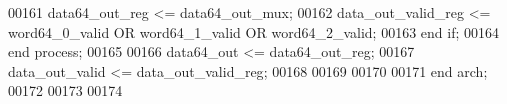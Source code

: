 \begin{DoxyCode}
00161          \textcolor{vhdlchar}{data64_out_reg}     \textcolor{vhdlchar}{<=} \textcolor{vhdlchar}{data64_out_mux}; 
00162             \textcolor{vhdlchar}{data_out_valid_reg} \textcolor{vhdlchar}{<=} \textcolor{vhdlchar}{word64_0_valid} \textcolor{keywordflow}{OR} \textcolor{vhdlchar}{word64_1_valid} \textcolor{keywordflow}{OR} \textcolor{vhdlchar}{
      word64_2_valid};
00163         \textcolor{keywordflow}{end} \textcolor{keywordflow}{if};
00164     \textcolor{keywordflow}{end} \textcolor{keywordflow}{process};
00165     
00166 \textcolor{vhdlchar}{data64_out}     \textcolor{vhdlchar}{<=} \textcolor{vhdlchar}{data64_out_reg};
00167 \textcolor{vhdlchar}{data_out_valid} \textcolor{vhdlchar}{<=} \textcolor{vhdlchar}{data_out_valid_reg};
00168 
00169  
00170 
00171 \textcolor{keywordflow}{end} \textcolor{vhdlchar}{arch};   
00172 
00173 
00174 
\end{DoxyCode}
